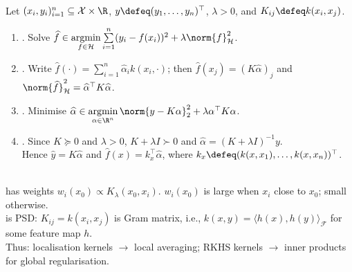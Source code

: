 \begin{method} \label{meth:sl-kernel-ridge-regression} \\
Let $(x_i,y_i)_{i=1}^n\subseteq\mathcal{X}\times\R$, $y\defeq(y_1,\ldots,y_n)^\top$, $\lambda>0$, and $K_{ij}\defeq k(x_i,x_j)$.
\begin{enumerate}[label=(\roman*)]
\setlength{\itemsep}{0pt}
\item {}. Solve $\widehat{f}\in\operatorname*{argmin}\limits_{f\in\mathcal{H}}\sum\limits_{i=1}^n(y_i-f(x_i))^2+\lambda\norm{f}_{\mathcal{H}}^2$.
\item {}. Write $\widehat{f}(\cdot)=\sum\limits_{i=1}^n\widehat{\alpha}_ik(x_i,\cdot)$; then $\widehat{f}(x_j)=(K\widehat{\alpha})_j$ and $\norm{\widehat{f}}_{\mathcal{H}}^2=\widehat{\alpha}^\top K\widehat{\alpha}$.
\item {}. Minimise $\widehat{\alpha}\in\operatorname*{argmin}\limits_{\alpha\in\R^n}\norm{y-K\alpha}_2^2+\lambda\alpha^\top K\alpha$.
\item {}. Since $K\succeq0$ and $\lambda>0$, $K+\lambda I\succ0$ and $\widehat{\alpha}=(K+\lambda I)^{-1}y$.\\
Hence $\widehat{y}=K\widehat{\alpha}$ and $\widehat{f}(x)=k_x^\top\widehat{\alpha}$, where $k_x\defeq(k(x,x_1),\ldots,k(x,x_n))^\top$.
\end{enumerate}
\end{method}

\begin{remark} \label{rem:sl-localization-kernels-versus-rkhs-kernels} \\
 has weights $w_i(x_0)\propto K_\lambda(x_0,x_i)$. $w_i(x_0)$ is large when $x_i$ close to $x_0$; small otherwise.\\
 is PSD: $K_{ij}=k(x_i,x_j)$ is Gram matrix, i.e., $k(x,y)=\langle h(x),h(y)\rangle_{\mathcal{F}}$ for some feature map $h$.\\
Thus: localisation kernels $\to$ local averaging; RKHS kernels $\to$ inner products for global regularisation.
\end{remark}

